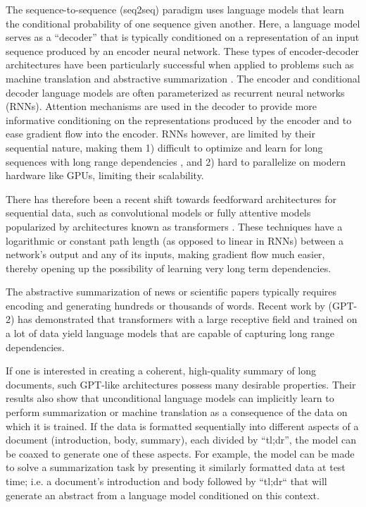 \documentclass[letterpaper]{article} \usepackage{arXiv_V2_aaai_sty_mods}  \usepackage{times}  \usepackage{helvet} \usepackage{courier}  \usepackage[hyphens]{url}  \usepackage{graphicx} \usepackage[utf8]{inputenc} \usepackage[T1]{fontenc}    \usepackage{url}            \usepackage{booktabs}       \usepackage{amsfonts}       \usepackage{nicefrac}       \usepackage{multirow}
\begin{document}
The sequence-to-sequence (seq2seq) paradigm \cite{sutskever2014sequence} uses language models that learn the conditional probability of one sequence given another. Here, a language model serves as a ``decoder'' that is typically conditioned on a representation of an input sequence produced by an encoder neural network. These types of encoder-decoder architectures have been particularly successful when applied to problems such as machine translation \cite{bahdanau2014neural} and abstractive summarization \cite{Rush2015AbsAttn}. The encoder and conditional decoder language models are often parameterized as recurrent neural networks (RNNs). Attention mechanisms \cite{bahdanau2014neural} are used in the decoder to provide more informative conditioning on the representations produced by the encoder and to ease gradient flow into the encoder. RNNs however, are limited by their sequential nature, making them 1) difficult to optimize and learn for long sequences with long range dependencies \cite{hochreiter1998vanishing,pascanu2013difficulty}, and 2) hard to parallelize on modern hardware like GPUs, limiting their scalability.



There has therefore been a recent shift towards feedforward architectures for sequential data, such as convolutional models \cite{kalchbrenner2016neural,van2016wavenet,gehring2017convolutional} or fully attentive models popularized by architectures known as transformers \cite{DBLP:journals/corr/VaswaniSPUJGKP17}. These techniques have a logarithmic or constant path length (as opposed to linear in RNNs) between a network's output and any of its inputs, making gradient flow much easier, thereby opening up the possibility of learning very long term dependencies.

The abstractive summarization of news or scientific papers typically requires encoding and generating hundreds or thousands of words. Recent work by \cite{radford2019language} (GPT-2) has demonstrated that transformers with a large receptive field and trained on a lot of data yield language models that are capable of capturing long range dependencies.

If one is interested in creating a coherent, high-quality summary of long documents, such GPT-like architectures possess many desirable properties. Their results also show that unconditional language models can implicitly learn to perform summarization or machine translation as a consequence of the data on which it is trained. If the data is formatted sequentially into different aspects of a document (introduction, body, summary), each divided by ``tl;dr'', the model can be coaxed to generate one of these aspects. For example, the model can be made to solve a summarization task by presenting it similarly formatted data at test time; i.e. a document's introduction and body followed by ``tl;dr`` that will generate an abstract from a language model conditioned on this context.
\end{document}
